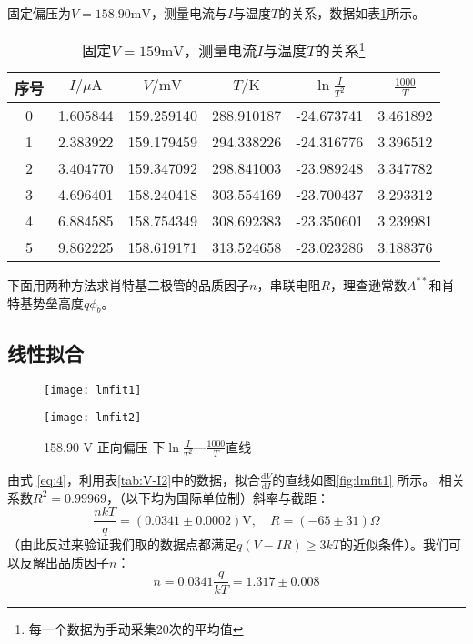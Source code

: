 \documentclass[aps,pre,12pt,preprint,onecolumn,showpacs,showkeys]{revtex4-1}
\def \d {\mathrm d}
\begin{document}
    固定偏压为$V=158.90 \mathrm{mV}$，测量电流与$I$与温度$T$的关系，数据如表\ref{tab:I-T}所示。
    \begin{table}[ht]
        \caption{\label{tab:I-T}%
        固定$V=159 \mathrm{mV}$，测量电流$I$与温度$T$的关系\footnote{每一个数据为手动采集20次的平均值}}
        \begin{tabular}{|c|c|c|c|c|c|}\hline
            序号&$I/\mu \mathrm A$&$V/\mathrm{mV}$&$T/\mathrm K$&$\ln\frac{I}{T^2}$&$\frac{1000}{T}$\\\hline
            0 &  1.605844 &  159.259140 &  288.910187 &  -24.673741 &  3.461892 \\\hline1 &  2.383922 &  159.179459 &  294.338226 &  -24.316776 &  3.396512 \\\hline2 &  3.404770 &  159.347092 &  298.841003 &  -23.989248 &  3.347782 \\\hline3 &  4.696401 &  158.240418 &  303.554169 &  -23.700437 &  3.293312 \\\hline4 &  6.884585 &  158.754349 &  308.692383 &  -23.350601 &  3.239981 \\\hline5 &  9.862225 &  158.619171 &  313.524658 &  -23.023286 &  3.188376 \\\hline
        \end{tabular}
    \end{table}

    下面用两种方法求肖特基二极管的品质因子$n$，串联电阻$R$，理查逊常数$A^{**}$和肖特基势垒高度$q\phi_b$。
    \subsection{线性拟合}
        \begin{figure}[ht]
            \begin{minipage}[t]{0.48\textwidth}
                \centering
                \texttt{[image: lmfit1]}
                \caption{\label{fig:lmfit1}%
                300 K 下$\frac{\d V}{\d I}$—$\frac{1}{I}$直线}
            \end{minipage}
            \begin{minipage}[t]{0.48\textwidth}
                \centering
                \texttt{[image: lmfit2]}
                \caption{\label{fig:lmfit2}%
                158.90 V 正向偏压 下$\ln \frac{I}{T^2}$—$\frac{1000}{T}$直线}
            \end{minipage}
        \end{figure}
        由式 \ref{eq:4}，利用表\ref{tab:V-I2}中的数据，拟合$\frac{\d V}{\d I}$的直线如图\ref{fig:lmfit1} 所示。
        相关系数$R^2=0.99969$，（以下均为国际单位制）斜率与截距：
        \begin{equation}\label{eq:R}
            \frac{nkT}{q}=(0.0341\pm 0.0002) \mathrm V,\quad R=(-65\pm31) \Omega
        \end{equation}
        （由此反过来验证我们取的数据点都满足$q(V-IR)\geqslant 3kT$的近似条件）。我们可以反解出品质因子$n$：
        \begin{equation}\label{eq:n}
            n=0.0341 \frac{q}{kT}=1.317\pm 0.008
        \end{equation}
        
\end{document}
